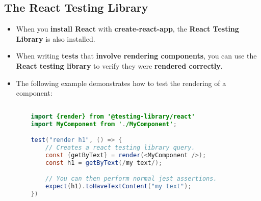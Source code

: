 \documentclass{article}
\begin{document}
    \subsection*{The React Testing Library}
    \begin{itemize}
        \item When you \textbf{install React} with \textbf{create-react-app}, the \textbf{React Testing Library} is also installed.
        \item When writing \textbf{tests} that \textbf{involve rendering components}, you can use the \textbf{React testing library} to verify they were \textbf{rendered correctly}.
        \item The following example demonstrates how to test the rendering of a component:
        \begin{lstlisting}[language=Java]
            
    import {render} from '@testing-library/react'
    import MyComponent from './MyComponent';

    test("render h1", () => {
        // Creates a react testing library query.
        const {getByText} = render(<MyComponent />);
        const h1 = getByText(/my text/);

        // You can then perform normal jest assertions.
        expect(h1).toHaveTextContent("my text");
    })
        \end{lstlisting}
    \end{itemize}
\end{document}
